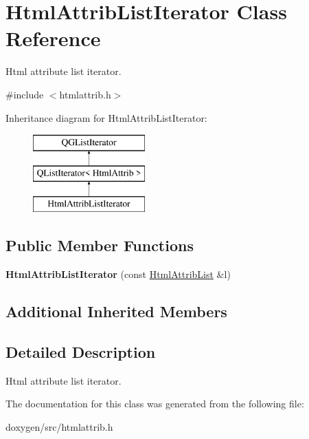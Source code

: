 \hypertarget{class_html_attrib_list_iterator}{}\section{Html\+Attrib\+List\+Iterator Class Reference}
\label{class_html_attrib_list_iterator}


Html attribute list iterator.  




{\ttfamily \#include $<$htmlattrib.\+h$>$}

Inheritance diagram for Html\+Attrib\+List\+Iterator\+:\begin{figure}[H]
\begin{center}
\leavevmode
\includegraphics[height=3.000000cm]{class_html_attrib_list_iterator}
\end{center}
\end{figure}
\subsection*{Public Member Functions}
\begin{DoxyCompactItemize}
\item 
\mbox{\label{class_html_attrib_list_iterator_afee20194ed45e3b90a0c6d8837d7427f}} 
{\bfseries Html\+Attrib\+List\+Iterator} (const \mbox{\hyperlink{class_html_attrib_list}{Html\+Attrib\+List}} \&l)
\end{DoxyCompactItemize}
\subsection*{Additional Inherited Members}


\subsection{Detailed Description}
Html attribute list iterator. 

The documentation for this class was generated from the following file\+:\begin{DoxyCompactItemize}
\item 
doxygen/src/htmlattrib.\+h\end{DoxyCompactItemize}
